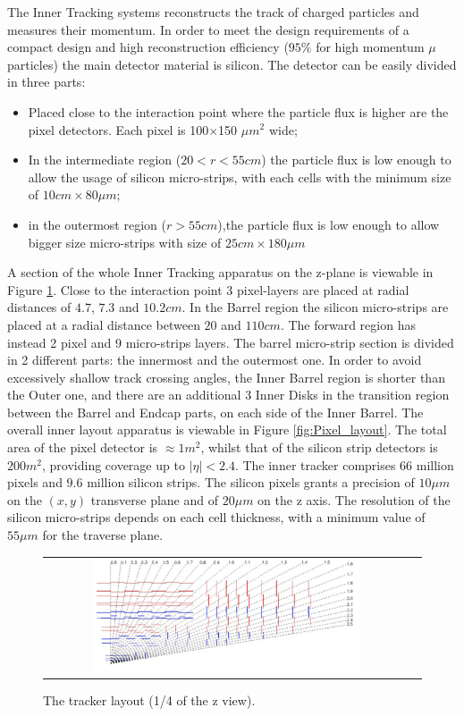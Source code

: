 The Inner Tracking systems reconstructs the track of charged particles and measures their momentum. In order to meet the design requirements of a compact design and high reconstruction efficiency ($95\%$ for high momentum $\mu$ particles) the main detector material is silicon.
The detector can be easily divided in three parts:
\begin{itemize}
	\item Placed close to the interaction point where the particle flux is higher are the pixel detectors. Each pixel is 100×150 $\mu m^{2}$ wide;
	\item In the intermediate region ($20 < r < 55 cm$) the particle flux is low enough to allow the usage of silicon micro-strips, with each cells with the minimum size of $10 cm × 80 \mu m$;
	\item in the outermost region ($r > 55 cm$),the particle flux is low enough to allow bigger size micro-strips with size of $25 cm × 180 \mu m$ 
\end{itemize}

A section of the whole Inner Tracking apparatus on the z-plane is viewable in Figure \ref{fig:Pixel_zview}. Close to the interaction point 3 pixel-layers are placed at radial distances of $4.7$, $7.3$ and $10.2 cm$. In the Barrel region the silicon micro-strips are placed at a radial distance between $20$ and $110 cm$. The forward region has instead 2 pixel and 9 micro-strips layers. The barrel micro-strip section is divided in 2 different parts: the innermost and the outermost one. In order to avoid excessively shallow track crossing angles, the Inner Barrel region is shorter than the Outer one, and there are an additional 3 Inner Disks in the transition region between the Barrel and Endcap parts, on each side of the Inner Barrel. The overall inner layout apparatus is viewable in Figure \ref{fig:Pixel_layout}. The total area of the pixel detector is $\approx 1 m^{2}$, whilst that of the silicon strip detectors is $200 m^{2}$, providing coverage up to $|\eta| < 2.4$. The inner tracker comprises 66 million pixels and $9.6$ million silicon strips. The silicon pixels grants a precision of $10 \mu m$ on the $(x,y)$ transverse plane and of $20 \mu m$ on the z axis. The resolution of the silicon micro-strips depends on each cell thickness, with a minimum value of $ 55 \mu m$ for the traverse plane.


\begin{figure}[tbh!]
	\centering
	\begin{tabular}{cc}
		\includegraphics[width=0.75\textwidth]{detector/pics/Pixel_zview.pdf}
	\end{tabular}
	\caption{The tracker layout (1/4 of the z view).}
	\label{fig:Pixel_zview}
\end{figure}

